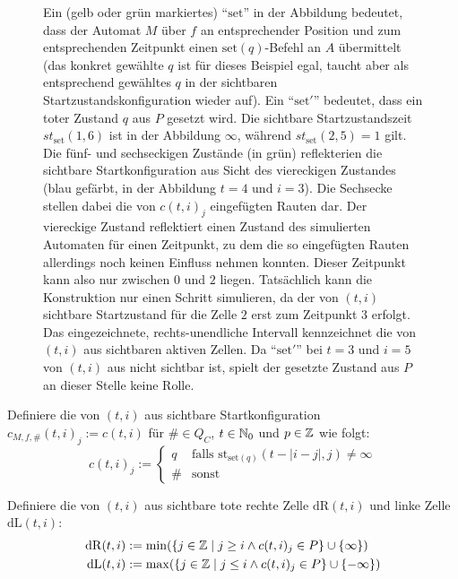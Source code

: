 \begin{definition}
\begin{figure}[h!]
        Ein (gelb oder grün markiertes) \enquote{$\mathrm{set}$} in der Abbildung bedeutet,
        dass der Automat $M$ über $f$ an entsprechender Position und zum entsprechenden Zeitpunkt
        einen $\mathrm{set}(q)$-Befehl an $A$ übermittelt (das konkret gewählte $q$ ist für dieses Beispiel egal, taucht aber als entsprechend gewähltes $q$ in der sichtbaren Startzustandskonfiguration wieder auf).
        Ein \enquote{$\mathrm{set}'$} bedeutet, dass ein toter Zustand $q$ aus $P$ gesetzt wird.
        Die sichtbare Startzustandszeit $st_{\mathrm{set}}(1, 6)$ ist in der Abbildung $\infty$,
        während $st_{\mathrm{set}}(2, 5) = 1$ gilt.
        Die fünf- und sechseckigen Zustände (in grün) reflekterien die sichtbare Startkonfiguration aus
        Sicht des viereckigen Zustandes (blau gefärbt, in der Abbildung $t = 4$ und $i = 3$).
        Die Sechsecke stellen dabei die von $c(t,i)_j$ eingefügten Rauten dar.
        Der viereckige Zustand reflektiert einen Zustand des simulierten Automaten für einen Zeitpunkt,
        zu dem die so eingefügten Rauten allerdings noch keinen Einfluss nehmen konnten.
        Dieser Zeitpunkt kann also nur zwischen $0$ und $2$ liegen. Tatsächlich kann die Konstruktion
        nur einen Schritt simulieren, da der von $(t, i)$ sichtbare Startzustand für die Zelle $2$ erst zum Zeitpunkt $3$ erfolgt.
        Das eingezeichnete, rechts-unendliche Intervall kennzeichnet die von $(t, i)$ aus sichtbaren aktiven Zellen.
        Da \enquote{$\mathrm{set}'$} bei $t = 3$ und $i = 5$ von $(t, i)$ aus nicht sichtbar ist,
        spielt der gesetzte Zustand aus $P$ an dieser Stelle keine Rolle.
        
    \end{figure}
    
    Definiere die von $(t, i)$ aus sichtbare Startkonfiguration $c_{M, f, \#}(t, i)_j := c(t, i)$
    für $\# \in Q_C$, $t \in \mathbb{N}_0$ und $p \in \mathbb{Z}$ wie folgt:
    \[
        c(t, i)_j :=
        \begin{cases}
            q & 
                \text{falls } \mathrm{st}_{\mathrm{set}(q)}(t - |i-j|, j) \neq \infty
             \\
            \# & \text{sonst}
        \end{cases}
    \]
    
    Definiere die von $(t, i)$ aus sichtbare tote rechte Zelle $\mathrm{dR}(t, i)$ und linke Zelle $\mathrm{dL}(t, i)$:
    \begin{align*}
        \mathrm{dR}(t, i) & := \min (\{ { j \in \mathbb{Z}} \; | \; {j \geq i \land c(t, i)_j \in P} \} \cup \{ { \infty } \}) \\
        \mathrm{dL}(t, i) & := \max (\{ { j \in \mathbb{Z}} \; | \; {j \leq i \land c(t, i)_j \in P} \} \cup \{ { -\infty } \})
    \end{align*}
    

\end{definition}
